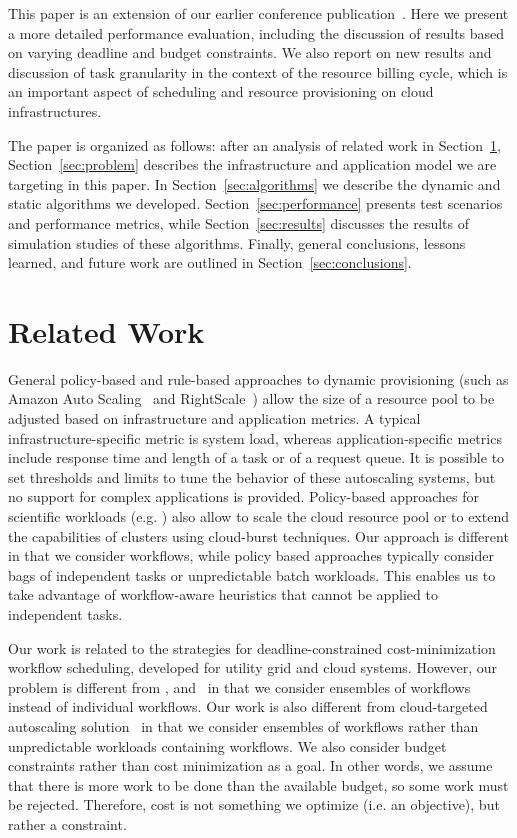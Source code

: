 \documentclass[preprint,5p]{elsarticle}
\begin{document}
This paper is an extension of our earlier conference
publication~\cite{Malawski-SC12}.
Here we present a more detailed performance evaluation, including the discussion
of results based on varying deadline and budget constraints. We also report on new
results and discussion of task granularity in the context of the resource
billing cycle, which is an important aspect of scheduling and resource provisioning
on cloud infrastructures.


The paper is organized as follows: after an analysis of related work in
Section~\ref{sec:related}, Section~\ref{sec:problem} describes the
infrastructure and application model we are targeting in this paper. In
Section~\ref{sec:algorithms} we describe the dynamic and static algorithms we
developed. Section~\ref{sec:performance} presents test scenarios and performance
metrics, while Section~\ref{sec:results} discusses the results of simulation
studies of these algorithms. Finally, general conclusions, lessons learned, and
future work are outlined in Section~\ref{sec:conclusions}.


\section{Related Work}
\label{sec:related}
General policy-based and rule-based approaches to dynamic provisioning (such as Amazon
Auto Scaling~\cite{Autoscaling} and
RightScale~\cite{RightScale}) allow the size
of a resource pool to be adjusted based on infrastructure and
application metrics. A typical infrastruc\-ture-specific metric is system load,
whereas application-speci\-fic metrics include response time and length of a task or
of a request queue. It is possible to set thresholds and limits to tune the behavior
of these autoscaling systems, but no support for complex applications is provided.
Policy-based approaches for scientific workloads (e.g. \cite{Marshall2010,
Kim2011}) also allow to scale the cloud resource pool or to extend the
capabilities of clusters using cloud-burst techniques. Our approach is different
in that we consider workflows, while policy based approaches typically consider
bags of independent tasks or unpredictable batch workloads. This enables us to
take advantage of workflow-aware heuristics that cannot be applied to
independent tasks.


Our work is related to the strategies for deadline-con\-strained
cost-minimization workflow scheduling, developed for utility grid and cloud
systems. However, our problem is different from
\cite{Yu2005},\cite{Abrishami2013158} and~\cite{Young2013} in that we consider
ensembles of workflows instead of individual workflows.
Our work is also different from cloud-targeted autoscaling
solution~\cite{Mao2011} in that we consider ensembles of workflows rather than
unpredictable workloads containing workflows. We also consider budget
constraints rather than cost minimization as a goal. In other words, we assume
that there is more work to be done than the available budget, so some work must
be rejected.
Therefore, cost is not something we optimize (i.e. an objective), but rather a
constraint.
\end{document}
